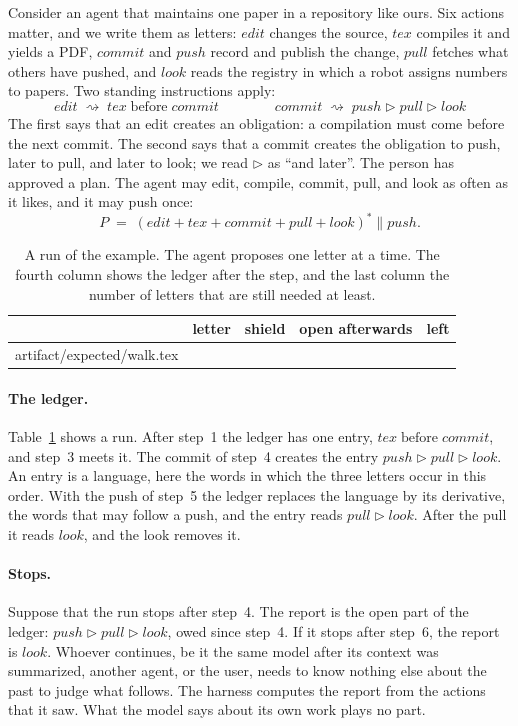 \documentclass[acmsmall,nonacm,screen]{acmart}
\makeatletter
\newcommand{\nm}[1]{\mathit{#1}}
\newcommand{\later}{\mathbin{\triangleright}}
\newcommand{\bef}{\mathrel{\text{before}}}
\newcommand{\sh}{\mathbin{\parallel}}
\newcommand{\creates}{\rightsquigarrow}
\newcommand{\edit}{\nm{edit}}
\newcommand{\tex}{\nm{tex}}
\newcommand{\commit}{\nm{commit}}
\newcommand{\push}{\nm{push}}
\newcommand{\pull}{\nm{pull}}
\newcommand{\look}{\nm{look}}
\newcommand{\rows}[1]{\@@input artifact/expected/#1.tex }
\makeatother
\begin{document}
Consider an agent that maintains one paper in a repository like ours. Six actions matter,
and we write them as letters: $\edit$ changes the source, $\tex$ compiles it and yields a
PDF, $\commit$ and $\push$ record and publish the change, $\pull$ fetches what others have
pushed, and $\look$ reads the registry in which a robot assigns numbers to papers. Two
standing instructions apply:
\[
  \edit \;\creates\; \tex \bef \commit
  \qquad\qquad
  \commit \;\creates\; \push \later \pull \later \look
\]
The first says that an edit creates an obligation: a compilation must come before the next
commit. The second says that a commit creates the obligation to push, later to pull, and
later to look; we read $\later$ as ``and later''. The person has approved a plan. The agent
may edit, compile, commit, pull, and look as often as it likes, and it may push once:
\[
  P \;=\; (\edit + \tex + \commit + \pull + \look)^{*} \sh \push .
\]

\begin{table}
\caption{A run of the example. The agent proposes one letter at a time. The fourth column
shows the ledger after the step, and the last column the number of letters that are still
needed at least.}
\label{tab:walk}
\begin{tabular}{rlp{5.6cm}lr}
\toprule
 & letter & shield & open afterwards & left \\
\midrule
\rows{walk}
\bottomrule
\end{tabular}
\end{table}

\paragraph{The ledger.} Table~\ref{tab:walk} shows a run. After step~1 the ledger has one
entry, $\tex \bef \commit$, and step~3 meets it. The commit of step~4 creates the entry
$\push \later \pull \later \look$. An entry is a language, here the words in which the three
letters occur in this order. With the push of step~5 the ledger replaces the language by its
derivative, the words that may follow a push, and the entry reads $\pull \later \look$.
After the pull it reads $\look$, and the look removes it.

\paragraph{Stops.} Suppose that the run stops after step~4. The report is the open part of
the ledger: $\push \later \pull \later \look$, owed since step~4. If it stops after step~6,
the report is $\look$. Whoever continues, be it the same model after its context was
summarized, another agent, or the user, needs to know nothing else about the past to judge
what follows. The harness computes the report from the actions that it saw. What the model says about its own work plays no part.
\end{document}
